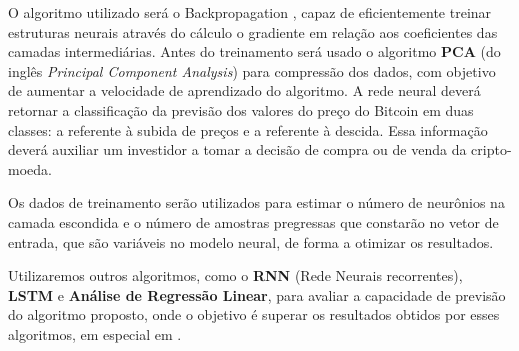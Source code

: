 O algoritmo utilizado será o Backpropagation \cite{hecht1992theory}, capaz de eficientemente treinar estruturas neurais através do cálculo o gradiente em relação aos coeficientes das camadas intermediárias. Antes do treinamento será usado o algoritmo \textbf{PCA} \cite{Jolliffe:1986} (do inglês \emph{Principal Component Analysis}) para compressão dos dados, com objetivo de aumentar a velocidade de aprendizado do algoritmo. A rede neural deverá retornar a classificação da previsão dos valores do preço do Bitcoin em duas classes: a referente à subida de preços e a referente à descida. Essa informação deverá auxiliar um investidor a tomar a decisão de compra ou de venda da cripto-moeda.


Os dados de treinamento serão utilizados para estimar o número de neurônios na camada escondida e o número de amostras pregressas que constarão no vetor de entrada, que são variáveis no modelo neural, de forma a otimizar os resultados. 

Utilizaremos outros algoritmos, como o \textbf{RNN} (Rede Neurais recorrentes), \textbf{LSTM}  e \textbf{Análise de Regressão Linear}, para avaliar a capacidade de previsão do algoritmo proposto, onde o objetivo é superar os resultados obtidos por esses algoritmos, em especial em \cite{mcnally2016predicting}.